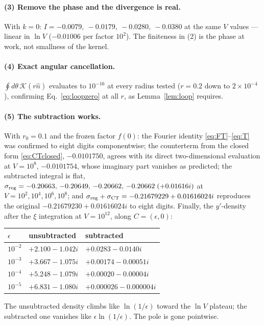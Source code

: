 \documentclass[11pt]{article}
\newcommand{\bC}{C}
\begin{document}
\paragraph{(3) Remove the phase and the divergence is real.}
With $k=0$: $I=-0.0079,\ -0.0179,\ -0.0280,\ -0.0380$ at the same $V$
values --- linear in $\ln V$ ($-0.01006$ per factor $10^{2}$).  The
finiteness in (2) is the phase at work, not smallness of the kernel.

\paragraph{(4) Exact angular cancellation.}
$\oint d\theta\,\mathcal K(r\hat n)$ evaluates to $10^{-16}$ at every
radius tested ($r=0.2$ down to $2\times10^{-4}$), confirming
Eq.~\eqref{eq:loopzero} at all $r$, as Lemma~\ref{lem:loop} requires.

\paragraph{(5) The subtraction works.}
With $r_0=0.1$ and the frozen factor $f(0)$:
the Fourier identity \eqref{eq:FT}--\eqref{eq:T} was confirmed to eight
digits componentwise; the counterterm from the closed form
\eqref{eq:CTclosed}, $-0.0101750$, agrees with its direct
two-dimensional evaluation at $V=10^{8}$, $-0.0101754$, whose imaginary
part vanishes as predicted; the subtracted integral is flat,
$\sigma_{\rm reg}=-0.20663,\,-0.20649,\,-0.20662,\,-0.20662\;(+0.01616i)$
at $V=10^{2},10^{4},10^{6},10^{8}$; and
$\sigma_{\rm reg}+\sigma_{\rm CT}=-0.21679229+0.01616024i$ reproduces
the original $-0.21679230+0.01616024i$ to eight digits.  Finally, the
$y'$-density after the $\xi$ integration at $V=10^{12}$, along
$\bC=(\epsilon,0)$:
\begin{center}
\begin{tabular}{lll}
\toprule
$\epsilon$ & unsubtracted & subtracted\\
\midrule
$10^{-2}$ & $+2.100-1.042i$ & $+0.0283-0.0140i$\\
$10^{-3}$ & $+3.667-1.075i$ & $+0.00174-0.00051i$\\
$10^{-4}$ & $+5.248-1.079i$ & $+0.00020-0.00004i$\\
$10^{-5}$ & $+6.831-1.080i$ & $+0.000026-0.000004i$\\
\bottomrule
\end{tabular}
\end{center}
The unsubtracted density climbs like $\ln(1/\epsilon)$ toward the
$\ln V$ plateau; the subtracted one vanishes like
$\epsilon\ln(1/\epsilon)$.  The pole is gone pointwise.
\end{document}
